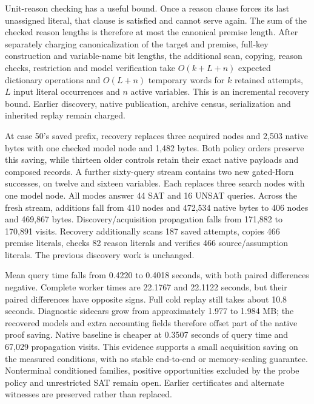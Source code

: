 \documentclass[11pt,a4paper]{article}
\numberwithin{equation}{section}
\theoremstyle{plain}
\theoremstyle{definition}
\theoremstyle{remark}
\begin{document}
Unit-reason checking has a useful bound. Once a reason clause forces its last
unassigned literal, that clause is satisfied and cannot serve again. The sum
of the checked reason lengths is therefore at most the canonical premise
length. After separately charging canonicalization of the target and premise,
full-key construction and variable-name bit lengths, the additional scan,
copying, reason checks, restriction and model verification take $O(k+L+n)$
expected dictionary operations and $O(L+n)$ temporary words for $k$ retained
attempts, $L$ input literal occurrences and $n$ active variables. This is an
incremental recovery bound. Earlier discovery, native publication, archive
census, serialization and inherited replay remain charged.

At case 50's saved prefix, recovery replaces three acquired nodes and 2,503
native bytes with one checked model node and 1,482 bytes. Both policy orders
preserve this saving, while thirteen older controls retain their exact native
payloads and composed records. A further sixty-query stream contains two new
gated-Horn successes, on twelve and sixteen variables. Each replaces three
search nodes with one model node. All modes answer 44 SAT and 16 UNSAT queries.
Across the fresh stream, additions fall from 410 nodes and 472,534 native bytes
to 406 nodes and 469,867 bytes. Discovery/acquisition propagation falls from
171,882 to 170,891 visits. Recovery additionally scans 187 saved attempts,
copies 466 premise literals, checks 82 reason literals and verifies 466
source/assumption literals. The previous discovery work is unchanged.

Mean query time falls from 0.4220 to 0.4018 seconds, with both paired differences
negative. Complete worker times are 22.1767 and 22.1122 seconds, but their
paired differences have opposite signs. Full cold replay still takes about
10.8 seconds. Diagnostic sidecars grow from approximately 1.977 to 1.984 MB;
the recovered models and extra accounting fields therefore offset part of the
native proof saving. Native baseline is cheaper at 0.3507 seconds of query
time and 67,029 propagation visits. This evidence supports a small acquisition
saving on the measured conditions, with no stable end-to-end or memory-scaling
guarantee. Nonterminal conditioned families, positive opportunities excluded by
the probe policy and unrestricted SAT remain open. Earlier certificates and
alternate witnesses are preserved rather than replaced.
\end{document}
